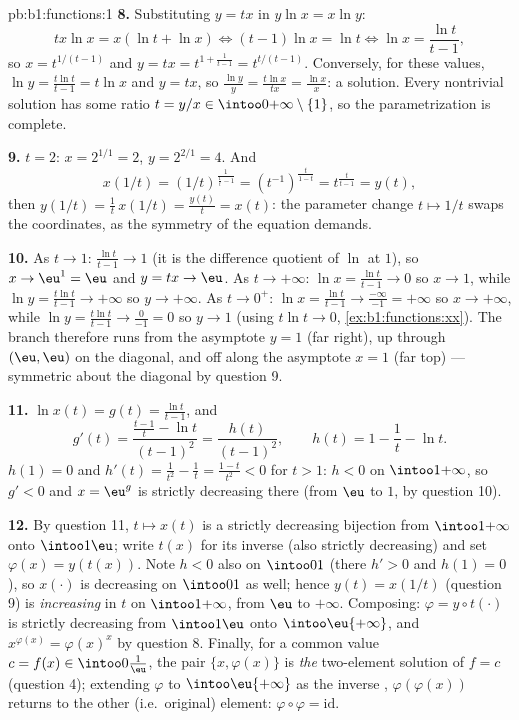 \begin{solution}{pb:b1:functions:1}
\textbf{8.} Substituting $y = tx$ in $y\ln x = x\ln y$:
\[
tx\ln x = x(\ln t + \ln x)
\iff (t - 1)\ln x = \ln t
\iff \ln x = \frac{\ln t}{t - 1} ,
\]
so $x = t^{1/(t-1)}$ and $y = tx = t^{1 + \frac1{t-1}} =
t^{t/(t-1)}$. Conversely, for these values, $\ln y = \frac{t\ln
t}{t-1} = t\ln x$ and $y = tx$, so $\frac{\ln y}y = \frac{t\ln
x}{tx} = \frac{\ln x}x$: a solution. Every nontrivial solution has
some ratio $t = y/x \in \intoo0{+\infty} \setminus \{1\}$, so the
parametrization is complete.

\textbf{9.} $t = 2$: $x = 2^{1/1} = 2$, $y = 2^{2/1} = 4$. And
\[
x(1/t) = (1/t)^{\frac1{\frac1t - 1}}
= (t^{-1})^{\frac{t}{1 - t}}
= t^{\frac{t}{t - 1}} = y(t) ,
\]
then $y(1/t) = \frac1t\,x(1/t) = \frac{y(t)}t = x(t)$: the
parameter change $t \mapsto 1/t$ swaps the coordinates, as the
symmetry of the equation demands.

\textbf{10.} As $t \to 1$: $\frac{\ln t}{t-1} \to 1$ (it is the
difference quotient of $\ln$ at $1$), so $x \to \eu^1 = \eu$ and
$y = tx \to \eu$. As $t \to +\infty$: $\ln x = \frac{\ln t}{t-1}
\to 0$ so $x \to 1$, while $\ln y = \frac{t\ln t}{t-1} \to
+\infty$ so $y \to +\infty$. As $t \to 0^+$: $\ln x = \frac{\ln
t}{t-1} \to \frac{-\infty}{-1} = +\infty$ so $x \to +\infty$,
while $\ln y = \frac{t\ln t}{t-1} \to \frac{0}{-1} = 0$ so $y \to
1$ (using $t\ln t \to 0$, \cref{ex:b1:functions:xx}). The branch
therefore runs from the asymptote $y = 1$ (far right), up through
$(\eu, \eu)$ on the diagonal, and off along the asymptote $x = 1$
(far top) --- symmetric about the diagonal by question 9.

\textbf{11.} $\ln x(t) = g(t) = \frac{\ln t}{t-1}$, and
\[
g'(t) = \frac{\frac{t-1}t - \ln t}{(t-1)^2}
= \frac{h(t)}{(t-1)^2},
\qquad h(t) = 1 - \frac1t - \ln t .
\]
$h(1) = 0$ and $h'(t) = \frac1{t^2} - \frac1t = \frac{1 -
t}{t^2} < 0$ for $t > 1$: $h < 0$ on $\intoo1{+\infty}$, so $g' <
0$ and $x = \eu^g$ is strictly decreasing there (from $\eu$ to
$1$, by question 10).

\textbf{12.} By question 11, $t \mapsto x(t)$ is a strictly
decreasing bijection from $\intoo1{+\infty}$ onto $\intoo1\eu$;
write $t(x)$ for its inverse (also strictly decreasing) and set
$\varphi(x) = y(t(x))$. Note $h < 0$ also on $\intoo01$ (there
$h' > 0$ and $h(1) = 0$), so $x(\cdot)$ is decreasing on
$\intoo01$ as well; hence $y(t) = x(1/t)$ (question 9) is
\emph{increasing} in $t$ on $\intoo1{+\infty}$, from $\eu$ to
$+\infty$. Composing: $\varphi = y \circ t(\cdot)$ is strictly
decreasing from $\intoo1\eu$ onto $\intoo\eu{+\infty}$, and
$x^{\varphi(x)} = \varphi(x)^x$ by question 8. Finally, for a
common value $c = f(x) \in \intoo0{\frac1\eu}$, the pair $\{x,
\varphi(x)\}$ is \emph{the} two-element solution  of $f = c$
(question 4); extending $\varphi$ to $\intoo\eu{+\infty}$ as the
inverse , $\varphi(\varphi(x))$ returns to the other (i.e.\
original) element: $\varphi \circ \varphi = \mathrm{id}$.


\end{solution}

